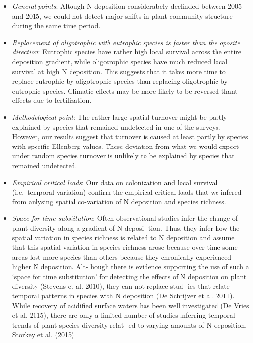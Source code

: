 \documentclass[fleqn,10pt,lineno]{wlpeerj} %
\theoremstyle{definition}
\theoremstyle{definition}
\theoremstyle{definition}
\theoremstyle{remark}
\begin{document}
\begin{itemize}
\item
  \emph{General points}: Altough N deposition considerabely declinded
  between 2005 and 2015, we could not detect major shifts in plant
  community structure during the same time period.
\item
  \emph{Replacement of oligotrophic with eutrophic species is faster
  than the oposite direction}: Eutrophic species have rather high local
  survival across the entire deposition gradient, while oligotrophic
  species have much reduced local survival at high N deposition. This
  suggests that it takes more time to replace eutrophic by oligotrophic
  species than replacing oligotrophic by eutrophic species. Climatic
  effects may be more likely to be reversed thant effects due to
  fertilization.
\item
  \emph{Methodological point}: The rather large spatial turnover might
  be partly explained by species that remained undetected in one of the
  surveys. However, our results suggest that turnover is caused at least
  partly by species with specific Ellenberg values. These deviation from
  what we would expect under random species turnover is unlikely to be
  explained by species that remained undetected.
\item
  \emph{Empirical critical loads}: Our data on colonization and local
  survival (i.e.~temporal variation) confirm the empirical critical
  loads that we infered from anlysing spatial co-variation of N
  deposition and species richness.
\item
  \emph{Space for time substitution}: Often observational studies infer
  the change of plant diversity along a gradient of N deposi- tion.
  Thus, they infer how the spatial variation in species richness is
  related to N deposition and assume that this spatial variation in
  species richness arose because over time some areas lost more species
  than others because they chronically experienced higher N deposition.
  Alt- hough there is evidence supporting the use of such a `space for
  time substitution' for detecting the effects of N deposition on plant
  diversity (Stevens et al. 2010), they can not replace stud- ies that
  relate temporal patterns in species with N deposition (De Schrijver et
  al. 2011). While recovery of acidified surface waters has been well
  investigated (De Vries et al. 2015), there are only a limited number
  of studies inferring temporal trends of plant species diversity relat-
  ed to varying amounts of N-deposition. Storkey et al. (2015)

\end{itemize}
\end{document}
